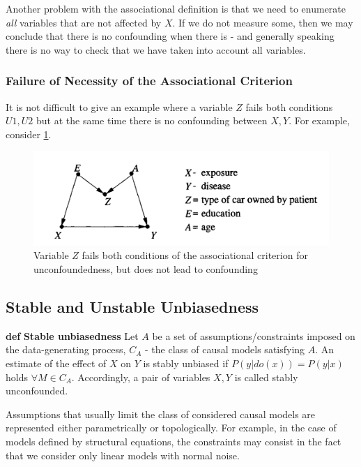\documentclass[fleqn]{article}
\def\define#1{\textbf{def} \textbf{#1}}
\numberwithin{equation}{section}
\numberwithin{theorem}{section}
\numberwithin{figure}{section}
\numberwithin{lemma}{section}
\numberwithin{corollary}{section}
\begin{document}
Another problem with the associational definition is that we need to enumerate \textit{all} variables that are not affected by $X$. If we do not measure some, then we may conclude that there is no confounding when there is - and generally speaking there is no way to check that we have taken into account all variables.

\subsubsection*{Failure of Necessity of the Associational Criterion}

It is not difficult to give an example where a variable $Z$ fails both conditions $U1, U2$ but at the same time there is no confounding between $X,Y$. For example, consider \ref{fig:confounding}.

\begin{figure}[h]
	\begin{center}
		\includegraphics[scale=0.6]{imgs/img30.png}
	\end{center}
	\caption{Variable $Z$ fails both conditions of the associational criterion for unconfoundedness, but does not lead to confounding}
	\label{fig:confounding}
\end{figure}

\subsection*{Stable and Unstable Unbiasedness}

\define{Stable unbiasedness} Let $A$ be a set of assumptions/constraints imposed on the data-generating process, $C_A$ - the class of causal models satisfying $A$. An estimate of the effect of $X$ on $Y$ is stably unbiased if $P(y|do(x)) = P(y|x)$ holds $\forall M \in C_A$. Accordingly, a pair of variables $X,Y$ is called stably unconfounded.

Assumptions that usually limit the class of considered causal models are represented either parametrically or topologically. For example, in the case of models defined by structural equations, the constraints may consist in the fact that we consider only linear models with normal noise.
\end{document}
